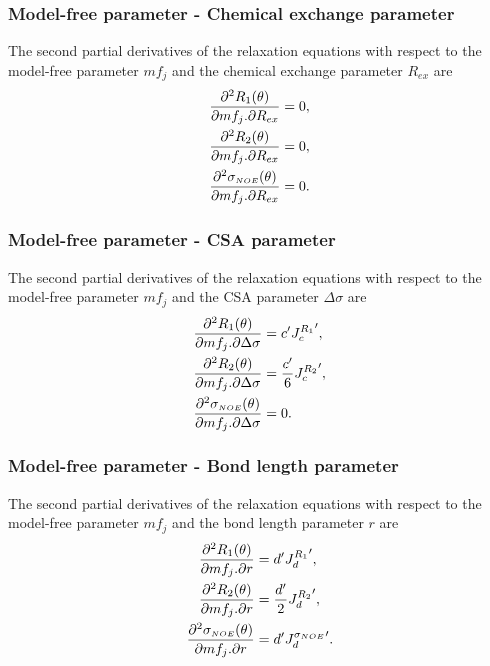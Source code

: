 \subsubsection{Model-free parameter - Chemical exchange parameter}

The second partial derivatives of the relaxation equations with respect to the model-free parameter $mf_j$ and the chemical exchange parameter $R_{ex}$ are
\begin{align}
    \frac{\partial^2 R_1(\theta)}{\partial mf_j . \partial R_{ex}} &= 0,        \label{eq: Ri': d2R1/dmfj.dRex} \\
    \frac{\partial^2 R_2(\theta)}{\partial mf_j . \partial R_{ex}} &= 0,        \label{eq: Ri': d2R2/dmfj.dRex} \\
    \frac{\partial^2 \sigma_{\scriptscriptstyle NOE}(\theta)}{\partial mf_j . \partial R_{ex}} &= 0.  \label{eq: Ri': d2sigmaNOE/dmfj.dRex}
\end{align}


\subsubsection{Model-free parameter - CSA parameter}

The second partial derivatives of the relaxation equations with respect to the model-free parameter $mf_j$ and the CSA parameter $\Delta\sigma$ are
\begin{align}
    \frac{\partial^2 R_1(\theta)}{\partial mf_j . \partial \Delta\sigma} &= c' {J_c^{R_1}}',            \label{eq: Ri': d2R1/dmfj.dCSA} \\
    \frac{\partial^2 R_2(\theta)}{\partial mf_j . \partial \Delta\sigma} &= \frac{c'}{6} {J_c^{R_2}}',  \label{eq: Ri': d2R2/dmfj.dCSA} \\
    \frac{\partial^2 \sigma_{\scriptscriptstyle NOE}(\theta)}{\partial mf_j . \partial \Delta\sigma} &= 0.                    \label{eq: Ri': d2sigmaNOE/dmfj.dCSA}
\end{align}


\subsubsection{Model-free parameter - Bond length parameter}

The second partial derivatives of the relaxation equations with respect to the model-free parameter $mf_j$ and the bond length parameter $r$ are
\begin{align}
    \frac{\partial^2 R_1(\theta)}{\partial mf_j . \partial r} &= d' {J_d^{R_1}}',               \label{eq: Ri': d2R1/dmfj.dr} \\
    \frac{\partial^2 R_2(\theta)}{\partial mf_j . \partial r} &= \frac{d'}{2} {J_d^{R_2}}',     \label{eq: Ri': d2R2/dmfj.dr} \\
    \frac{\partial^2 \sigma_{\scriptscriptstyle NOE}(\theta)}{\partial mf_j . \partial r} &= d' {J_d^{\sigma_{\scriptscriptstyle NOE}}}'.   \label{eq: Ri': d2sigmaNOE/dmfj.dr}
\end{align}


